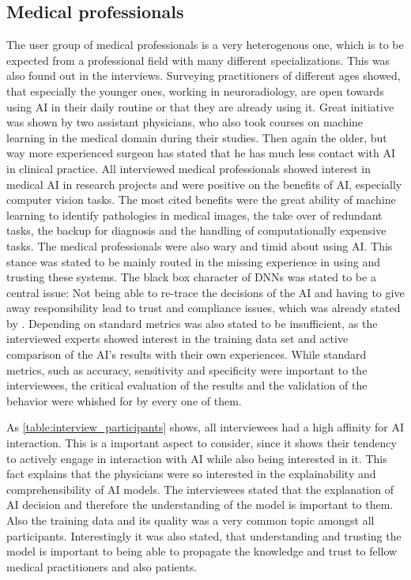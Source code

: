 \documentclass[11pt,a4paper,english]{scrreprt}
\begin{document}
\subsection{Medical professionals}
The user group of medical professionals is a very heterogenous one, which is to be expected from a professional field with many different specializations. This was also found out in the interviews. Surveying practitioners of different ages showed, that especially the younger ones, working in neuroradiology, are open towards using AI in their daily routine or that they are already using it. Great initiative was shown by two assistant physicians, who also took courses on machine learning in the medical domain during their studies. Then again the older, but way more experienced surgeon has stated that he has much less contact with AI in clinical practice. All interviewed medical professionals showed interest in medical AI in research projects and were positive on the benefits of AI, especially computer vision tasks. The most cited benefits were the great ability of machine learning to identify pathologies in medical images, the take over of redundant tasks, the backup for diagnosis and the handling of computationally expensive tasks. The medical professionals were also wary and timid about using AI. This stance was stated to be mainly routed in the missing experience in using and trusting these systems. The black box character of DNNs was stated to be a central issue: Not being able to re-trace the decisions of the AI and having to give away responsibility lead to trust and compliance issues, which was already stated by \textcite{ras_explainable_2021}. Depending on standard metrics was also stated to be insufficient, as the interviewed experts showed interest in the training data set and active comparison of the AI's results with their own experiences. While standard metrics, such as accuracy, sensitivity and specificity were important to the interviewees, the critical evaluation of the results and the validation of the behavior were whished for by every one of them.

As \autoref{table:interview_participants} shows, all interviewees had a high affinity for AI interaction. This is a important aspect to consider, since it shows their tendency to actively engage in interaction with AI while also being interested in it. This fact explains that the physicians were so interested in the explainability and comprehensibility of AI models. The interviewees stated that the explanation of AI decision and therefore the understanding of the model is important to them. Also the training data and its quality was a very common topic amongst all participants. Interestingly it was also stated, that understanding and trusting the model is important to being able to propagate the knowledge and trust to fellow medical practitioners and also patients.
\end{document}
